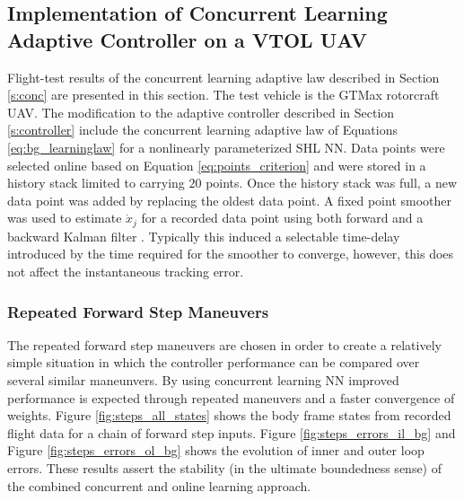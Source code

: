 \subsection{Implementation of Concurrent Learning Adaptive Controller on a VTOL UAV}\label{s:conc_flight_test}
Flight-test results of the concurrent learning adaptive law described in Section \ref{s:conc} are presented in this section. The test vehicle is the GTMax rotorcraft UAV. The modification to the adaptive controller described in Section \ref{s:controller} include the concurrent learning adaptive law of Equations \ref{eq:bg_learninglaw} for a nonlinearly parameterized SHL NN. Data points were selected online based on Equation \ref{eq:points_criterion} and were stored in a history stack limited to carrying $20$ points. Once the history stack was full,  a new data point was added by replacing the oldest data point. A fixed point smoother was used to estimate $\dot x_j$ for a recorded data point using both forward and a backward Kalman filter \cite{Chowdhary:JGCD:10,Gelb:74bk}. Typically this induced a selectable time-delay introduced by the time required for the smoother to converge, however, this does not affect the instantaneous tracking error.

\subsubsection{Repeated Forward Step Maneuvers}
\label{sec:bg_steps}
The repeated forward step maneuvers are chosen in order to create a relatively simple situation in which the controller performance can be compared over several similar maneunvers. By using concurrent learning NN improved performance is expected through repeated maneuvers and a faster convergence of weights. Figure \ref{fig:steps_all_states}  shows the body frame states from recorded flight data for a chain of forward step inputs. Figure \ref{fig:steps_errors_il_bg} and Figure \ref{fig:steps_errors_ol_bg} shows the evolution of inner and outer loop errors. These results assert the stability (in the ultimate boundedness sense) of the combined concurrent and online learning approach.

